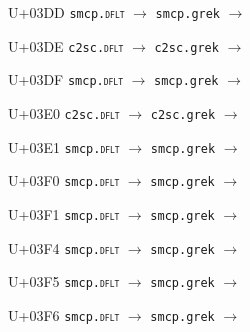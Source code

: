 \documentclass{article}
\begin{document}
\begin{substitutions}
\goodbreak

U+03DD  \linebreak
    \texttt{smcp.\textsc{dflt}} $\to$  \linebreak
    \texttt{smcp.grek} $\to$  

\goodbreak

U+03DE  \linebreak
    \texttt{c2sc.\textsc{dflt}} $\to$  \linebreak
    \texttt{c2sc.grek} $\to$  

\goodbreak

U+03DF  \linebreak
    \texttt{smcp.\textsc{dflt}} $\to$  \linebreak
    \texttt{smcp.grek} $\to$  

\goodbreak

U+03E0  \linebreak
    \texttt{c2sc.\textsc{dflt}} $\to$  \linebreak
    \texttt{c2sc.grek} $\to$  

\goodbreak

U+03E1  \linebreak
    \texttt{smcp.\textsc{dflt}} $\to$  \linebreak
    \texttt{smcp.grek} $\to$  

\goodbreak

U+03F0  \linebreak
    \texttt{smcp.\textsc{dflt}} $\to$  \linebreak
    \texttt{smcp.grek} $\to$  

\goodbreak

U+03F1  \linebreak
    \texttt{smcp.\textsc{dflt}} $\to$  \linebreak
    \texttt{smcp.grek} $\to$  

\goodbreak

U+03F4  \linebreak
    \texttt{smcp.\textsc{dflt}} $\to$  \linebreak
    \texttt{smcp.grek} $\to$  

\goodbreak

U+03F5  \linebreak
    \texttt{smcp.\textsc{dflt}} $\to$  \linebreak
    \texttt{smcp.grek} $\to$  

\goodbreak

U+03F6  \linebreak
    \texttt{smcp.\textsc{dflt}} $\to$  \linebreak
    \texttt{smcp.grek} $\to$  

\goodbreak

\end{substitutions}
\end{document}
